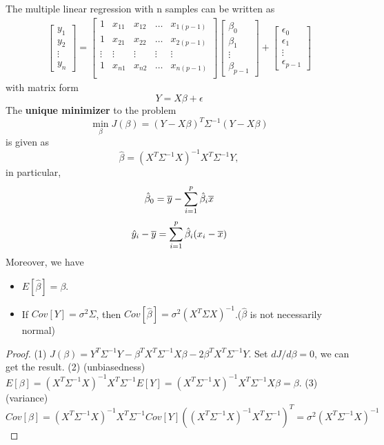 \begin{refsection}
\begin{theorem}\label{ch:statistical-models:th:GeneralizedLeastSquareSolution}
	The multiple linear regression with n samples can be written as
	\begin{align*}
	\begin{bmatrix}
	y_1\\
	y_2\\
	\vdots\\
	y_n
	\end{bmatrix} = \begin{bmatrix}
	1 & x_{11} & x_{12} & \dots & x_{1(p-1)}\\
	1 & x_{21} & x_{22} & \dots & x_{2(p-1)}\\
	\vdots & \vdots & \vdots & \vdots & \vdots \\
	1 & x_{n1} & x_{n2} & \dots & x_{n(p-1)}\\
	\end{bmatrix}
	\begin{bmatrix}
	\beta_0\\
	\beta_1\\
	\vdots\\
	\beta_{p-1}
	\end{bmatrix}
	+ \begin{bmatrix}
	\epsilon_0\\
	\epsilon_1\\
	\vdots\\
	\epsilon_{p-1}
	\end{bmatrix}
	\end{align*}
	with matrix form
	$$Y = X\beta + \epsilon$$
	The \textbf{unique minimizer} to the problem 
	$$\min_\beta J(\beta) = (Y-X\beta)^T\Sigma^{-1}(Y - X\beta)$$
	is given as
	$$\hat{\beta} = (X^T\Sigma^{-1}X)^{-1}X^T\Sigma^{-1}Y,$$
	in particular, $$\hat{\beta}_0 = \overline{y} - \sum_{i=1}^p \hat{\beta}_i \overline{x}$$
	$$\hat{y}_i - \overline{y} =\sum_{i=1}^p \hat{\beta}_i (x_i-\overline{x}) $$
	Moreover, we have
	\begin{itemize}
		\item $E[\hat{\beta}] = \beta$.
		\item If $Cov[Y] = \sigma^2\Sigma$, then $Cov[\hat{\beta}] = \sigma^2(X^T\Sigma X)^{-1}$.($\hat{\beta}$ is not necessarily normal)
	\end{itemize}
\end{theorem}
\begin{proof}
	(1) $J(\beta) = Y^T\Sigma^{-1}Y - \beta^TX^T\Sigma^{-1}X\beta - 2\beta^TX^T\Sigma^{-1}Y$. Set $dJ/d\beta = 0$, we can get the result.
	(2) (unbiasedness) $E[\beta] = (X^T\Sigma^{-1}X)^{-1}X^T\Sigma^{-1} E[Y] = (X^T\Sigma^{-1}X)^{-1}X^T\Sigma^{-1}X\beta = \beta.$
	(3) (variance) $Cov[\beta] = (X^T\Sigma^{-1}X)^{-1}X^T\Sigma^{-1}Cov[Y]((X^T\Sigma^{-1}X)^{-1}X^T\Sigma^{-1})^T = \sigma^2(X^T\Sigma^{-1}X)^{-1}$
\end{proof}



\end{refsection}
